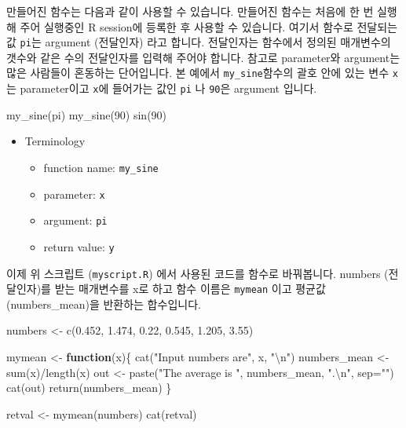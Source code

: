 \documentclass[
]{book}
\newenvironment{Shaded}{\begin{snugshade}}{\end{snugshade}}
\newcommand{\AttributeTok}[1]{\textcolor[rgb]{0.77,0.63,0.00}{#1}}
\newcommand{\ControlFlowTok}[1]{\textcolor[rgb]{0.13,0.29,0.53}{\textbf{#1}}}
\newcommand{\DecValTok}[1]{\textcolor[rgb]{0.00,0.00,0.81}{#1}}
\newcommand{\FloatTok}[1]{\textcolor[rgb]{0.00,0.00,0.81}{#1}}
\newcommand{\FunctionTok}[1]{\textcolor[rgb]{0.00,0.00,0.00}{#1}}
\newcommand{\NormalTok}[1]{#1}
\newcommand{\OtherTok}[1]{\textcolor[rgb]{0.56,0.35,0.01}{#1}}
\newcommand{\SpecialCharTok}[1]{\textcolor[rgb]{0.00,0.00,0.00}{#1}}
\newcommand{\StringTok}[1]{\textcolor[rgb]{0.31,0.60,0.02}{#1}}
\providecommand{\tightlist}{%
  \setlength{\itemsep}{0pt}\setlength{\parskip}{0pt}}
\begin{document}
만들어진 함수는 다음과 같이 사용할 수 있습니다. 만들어진 함수는 처음에 한 번 실행해 주어 실행중인 R session에 등록한 후 사용할 수 있습니다. 여기서 함수로 전달되는 값 \texttt{pi}는 argument (전달인자) 라고 합니다. 전달인자는 함수에서 정의된 매개변수의 갯수와 같은 수의 전달인자를 입력해 주어야 합니다. 참고로 parameter와 argument는 많은 사람들이 혼동하는 단어입니다. 본 예에서 \texttt{my\_sine}함수의 괄호 안에 있는 변수 \texttt{x}는 parameter이고 \texttt{x}에 들어가는 값인 \texttt{pi} 나 \texttt{90}은 argument 입니다.

\begin{Shaded}
\begin{Highlighting}[]
\FunctionTok{my\_sine}\NormalTok{(pi)}
\FunctionTok{my\_sine}\NormalTok{(}\DecValTok{90}\NormalTok{)}
\FunctionTok{sin}\NormalTok{(}\DecValTok{90}\NormalTok{)}
\end{Highlighting}
\end{Shaded}

\begin{itemize}
\item
  Terminology

  \begin{itemize}
  \tightlist
  \item
    function name: \texttt{my\_sine}
  \item
    parameter: \texttt{x}
  \item
    argument: \texttt{pi}
  \item
    return value: \texttt{y}
  \end{itemize}
\end{itemize}

이제 위 스크립트 (\texttt{myscript.R}) 에서 사용된 코드를 함수로 바꿔봅니다. numbers (전달인자)를 받는 매개변수를 x로 하고 함수 이름은 \texttt{mymean} 이고 평균값 (numbers\_mean)을 반환하는 합수입니다.

\begin{Shaded}
\begin{Highlighting}[]
\NormalTok{numbers }\OtherTok{\textless{}{-}} \FunctionTok{c}\NormalTok{(}\FloatTok{0.452}\NormalTok{, }\FloatTok{1.474}\NormalTok{, }\FloatTok{0.22}\NormalTok{, }\FloatTok{0.545}\NormalTok{, }\FloatTok{1.205}\NormalTok{, }\FloatTok{3.55}\NormalTok{)}

\NormalTok{mymean }\OtherTok{\textless{}{-}} \ControlFlowTok{function}\NormalTok{(x)\{}
  \FunctionTok{cat}\NormalTok{(}\StringTok{"Input numbers are"}\NormalTok{, x, }\StringTok{"}\SpecialCharTok{\textbackslash{}n}\StringTok{"}\NormalTok{)}
\NormalTok{  numbers\_mean }\OtherTok{\textless{}{-}} \FunctionTok{sum}\NormalTok{(x)}\SpecialCharTok{/}\FunctionTok{length}\NormalTok{(x)}
\NormalTok{  out }\OtherTok{\textless{}{-}} \FunctionTok{paste}\NormalTok{(}\StringTok{"The average is "}\NormalTok{, numbers\_mean, }\StringTok{".}\SpecialCharTok{\textbackslash{}n}\StringTok{"}\NormalTok{, }\AttributeTok{sep=}\StringTok{""}\NormalTok{)}
  \FunctionTok{cat}\NormalTok{(out)}
  \FunctionTok{return}\NormalTok{(numbers\_mean)}
\NormalTok{\}}

\NormalTok{retval }\OtherTok{\textless{}{-}} \FunctionTok{mymean}\NormalTok{(numbers)}
\FunctionTok{cat}\NormalTok{(retval)}
\end{Highlighting}
\end{Shaded}
\end{document}
